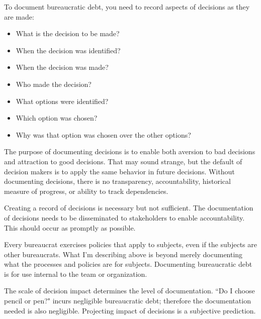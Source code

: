 To document bureaucratic debt, you need to record aspects of decisions as they are made:
\begin{itemize}
    \item What is the decision to be made?
    \item When the decision was identified?
    \item When the decision was made?
    \item Who made the decision?
    \item What options were identified?
    \item Which option was chosen?
    \item Why was that option was chosen over the other options?
\end{itemize}
The purpose of documenting decisions is to enable both aversion to bad decisions and attraction to good decisions. That may sound strange, but the default of decision makers is to apply the same behavior in future decisions. 
Without documenting decisions, there is no transparency, accountability, historical measure of progress, or ability to track dependencies. 

Creating a record of decisions is necessary but not sufficient. The documentation of decisions needs to be disseminated to stakeholders to enable accountability. This should occur as promptly as possible. 

Every bureaucrat exercises policies that apply to subjects, even if the subjects are other bureaucrats. What I'm describing above is beyond merely documenting what the processes and policies are for subjects. Documenting bureaucratic debt is for use internal to the team or organization.  

The scale of decision impact determines the level of documentation. ``Do I choose pencil or pen?" incurs negligible bureaucratic debt; therefore the documentation needed is also negligible. Projecting impact of decisions is a subjective prediction. 


